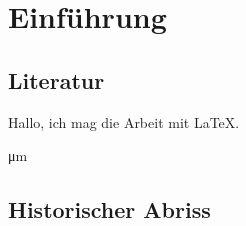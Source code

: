 \chapter{Einführung}\label{cha:einführung}
\section{Literatur}

\cite{knuth:1984} 

\blindtext[1] Hallo, ich mag die Arbeit mit \LaTeX.

\si{\micro\meter}

\blindtext[1]

\blindtext[1]

\blindtext[1]

\blindtext[2]


\section{Historischer Abriss}

\blindtext[5]
